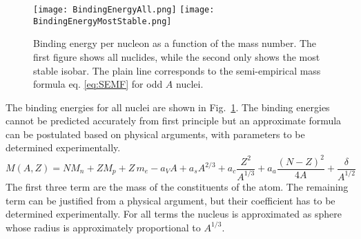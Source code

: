 \documentclass[12pt]{article}
\begin{document}
\begin{figure}
\texttt{[image: BindingEnergyAll.png]}
\texttt{[image: BindingEnergyMostStable.png]}
\caption{Binding energy per nucleon as a function of the mass number. The first figure shows all nuclides, while the second only shows the most stable isobar. The plain line corresponds to the semi-empirical mass formula eq. \ref{eq:SEMF} for odd $A$ nuclei.}\label{fig:bindingEnergies}
\end{figure}

The binding energies for all nuclei are shown in Fig.~\ref{fig:bindingEnergies}. The binding energies cannot be predicted accurately from first principle but an approximate formula can be postulated based on physical arguments, with parameters to be determined experimentally. 
\begin{equation}\label{eq:SEMF}
M(A,Z)=N M_n+Z M_p+Z\, m_e-a_V A + a_sA^{2/3}+a_c\frac{Z^2}{A^{1/3}}+a_a\frac{(N-Z)^2}{4A}+\frac{\delta}{A^{1/2}}
\end{equation}  
The first three term are the mass of the constituents of the atom. The remaining term can be justified from a physical argument, but their coefficient has to be determined experimentally. For all terms the nucleus is approximated as sphere whose radius is approximately proportional to $A^{1/3}$.
\end{document}
